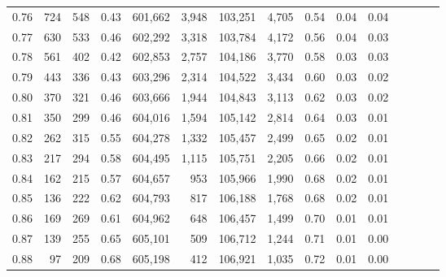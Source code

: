 \begin{tabular}{rrrcrrrrrrrrrrr}
0.76 &     724 &    548 &                                       0.43 &  601,662 &    3,948 &  103,251 &    4,705 &  0.54 &  0.04 &                         0.04 \\
0.77 &     630 &    533 &                                       0.46 &  602,292 &    3,318 &  103,784 &    4,172 &  0.56 &  0.04 &                         0.03 \\
0.78 &     561 &    402 &                                       0.42 &  602,853 &    2,757 &  104,186 &    3,770 &  0.58 &  0.03 &                         0.03 \\
0.79 &     443 &    336 &                                       0.43 &  603,296 &    2,314 &  104,522 &    3,434 &  0.60 &  0.03 &                         0.02 \\
0.80 &     370 &    321 &                                       0.46 &  603,666 &    1,944 &  104,843 &    3,113 &  0.62 &  0.03 &                         0.02 \\
0.81 &     350 &    299 &                                       0.46 &  604,016 &    1,594 &  105,142 &    2,814 &  0.64 &  0.03 &                         0.01 \\
0.82 &     262 &    315 &                                       0.55 &  604,278 &    1,332 &  105,457 &    2,499 &  0.65 &  0.02 &                         0.01 \\
0.83 &     217 &    294 &                                       0.58 &  604,495 &    1,115 &  105,751 &    2,205 &  0.66 &  0.02 &                         0.01 \\
0.84 &     162 &    215 &                                       0.57 &  604,657 &      953 &  105,966 &    1,990 &  0.68 &  0.02 &                         0.01 \\
0.85 &     136 &    222 &                                       0.62 &  604,793 &      817 &  106,188 &    1,768 &  0.68 &  0.02 &                         0.01 \\
0.86 &     169 &    269 &                                       0.61 &  604,962 &      648 &  106,457 &    1,499 &  0.70 &  0.01 &                         0.01 \\
0.87 &     139 &    255 &                                       0.65 &  605,101 &      509 &  106,712 &    1,244 &  0.71 &  0.01 &                         0.00 \\
0.88 &      97 &    209 &                                       0.68 &  605,198 &      412 &  106,921 &    1,035 &  0.72 &  0.01 &                         0.00 \\

\end{tabular}
